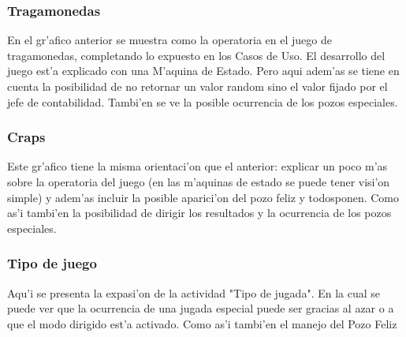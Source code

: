 \subsubsection{Tragamonedas}

En el gr'afico anterior se muestra como la operatoria en el juego de tragamonedas, completando lo expuesto en los Casos de Uso. El desarrollo del juego est'a explicado con una M'aquina de Estado. Pero aqui adem'as se tiene en cuenta la posibilidad de no retornar un valor random sino el valor fijado por el jefe de contabilidad. Tambi'en se ve la posible ocurrencia de los pozos especiales.

\clearpage


\subsubsection{Craps}

Este gr'afico tiene la misma orientaci'on que el anterior: explicar un poco m'as sobre la operatoria del juego (en las m'aquinas de estado se puede tener visi'on simple) y adem'as incluir la posible aparici'on del pozo feliz y todosponen. Como as'i tambi'en la posibilidad de dirigir los resultados y la ocurrencia de los pozos especiales.

\clearpage


\subsubsection{Tipo de juego}

Aqu'i se presenta la expasi'on de la actividad "Tipo de jugada". En la cual se puede ver que la ocurrencia de una jugada especial puede ser gracias al azar o a  que el modo dirigido est'a activado. Como as'i tambi'en el manejo del Pozo Feliz


